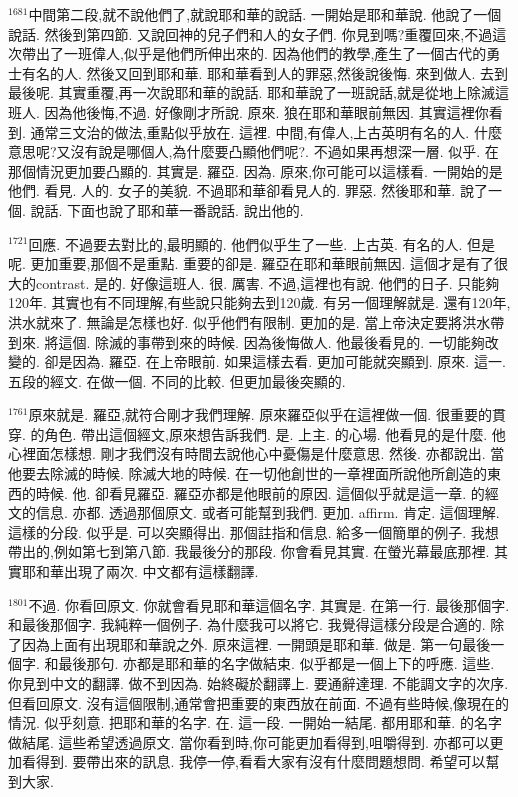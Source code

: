 \documentclass{book}
\begin{document}
$^{1681}$中間第二段,就不說他們了,就說耶和華的說話.
一開始是耶和華說.
他說了一個說話.
然後到第四節.
又說回神的兒子們和人的女子們.
你見到嗎?重覆回來,不過這次帶出了一班偉人,似乎是他們所伸出來的.
因為他們的教學,產生了一個古代的勇士有名的人.
然後又回到耶和華.
耶和華看到人的罪惡,然後說後悔.
來到做人.
去到最後呢.
其實重覆,再一次說耶和華的說話.
耶和華說了一班說話,就是從地上除滅這班人.
因為他後悔,不過.
好像剛才所說.
原來.
狼在耶和華眼前無因.
其實這裡你看到.
通常三文治的做法,重點似乎放在.
這裡.
中間,有偉人,上古英明有名的人.
什麼意思呢?又沒有說是哪個人,為什麼要凸顯他們呢?.
不過如果再想深一層.
似乎.
在那個情況更加要凸顯的.
其實是.
羅亞.
因為.
原來,你可能可以這樣看.
一開始的是他們.
看見.
人的.
女子的美貌.
不過耶和華卻看見人的.
罪惡.
然後耶和華.
說了一個.
說話.
下面也說了耶和華一番說話.
說出他的.

$^{1721}$回應.
不過要去對比的,最明顯的.
他們似乎生了一些.
上古英.
有名的人.
但是呢.
更加重要,那個不是重點.
重要的卻是.
羅亞在耶和華眼前無因.
這個才是有了很大的contrast.
是的.
好像這班人.
很.
厲害.
不過,這裡也有說.
他們的日子.
只能夠120年.
其實也有不同理解,有些說只能夠去到120歲.
有另一個理解就是.
還有120年,洪水就來了.
無論是怎樣也好.
似乎他們有限制.
更加的是.
當上帝決定要將洪水帶到來.
將這個.
除滅的事帶到來的時候.
因為後悔做人.
他最後看見的.
一切能夠改變的.
卻是因為.
羅亞.
在上帝眼前.
如果這樣去看.
更加可能就突顯到.
原來.
這一.
五段的經文.
在做一個.
不同的比較.
但更加最後突顯的.

$^{1761}$原來就是.
羅亞,就符合剛才我們理解.
原來羅亞似乎在這裡做一個.
很重要的貫穿.
的角色.
帶出這個經文,原來想告訴我們.
是.
上主.
的心場.
他看見的是什麼.
他心裡面怎樣想.
剛才我們沒有時間去說他心中憂傷是什麼意思.
然後.
亦都說出.
當他要去除滅的時候.
除滅大地的時候.
在一切他創世的一章裡面所說他所創造的東西的時候.
他.
卻看見羅亞.
羅亞亦都是他眼前的原因.
這個似乎就是這一章.
的經文的信息.
亦都.
透過那個原文.
或者可能幫到我們.
更加.
affirm.
肯定.
這個理解.
這樣的分段.
似乎是.
可以突顯得出.
那個註指和信息.
給多一個簡單的例子.
我想帶出的,例如第七到第八節.
我最後分的那段.
你會看見其實.
在螢光幕最底那裡.
其實耶和華出現了兩次.
中文都有這樣翻譯.

$^{1801}$不過.
你看回原文.
你就會看見耶和華這個名字.
其實是.
在第一行.
最後那個字.
和最後那個字.
我純粹一個例子.
為什麼我可以將它.
我覺得這樣分段是合適的.
除了因為上面有出現耶和華說之外.
原來這裡.
一開頭是耶和華.
做是.
第一句最後一個字.
和最後那句.
亦都是耶和華的名字做結束.
似乎都是一個上下的呼應.
這些.
你見到中文的翻譯.
做不到因為.
始終礙於翻譯上.
要通辭達理.
不能調文字的次序.
但看回原文.
沒有這個限制,通常會把重要的東西放在前面.
不過有些時候,像現在的情況.
似乎刻意.
把耶和華的名字.
在.
這一段.
一開始一結尾.
都用耶和華.
的名字做結尾.
這些希望透過原文.
當你看到時,你可能更加看得到,咀嚼得到.
亦都可以更加看得到.
要帶出來的訊息.
我停一停,看看大家有沒有什麼問題想問.
希望可以幫到大家.
\end{document}
